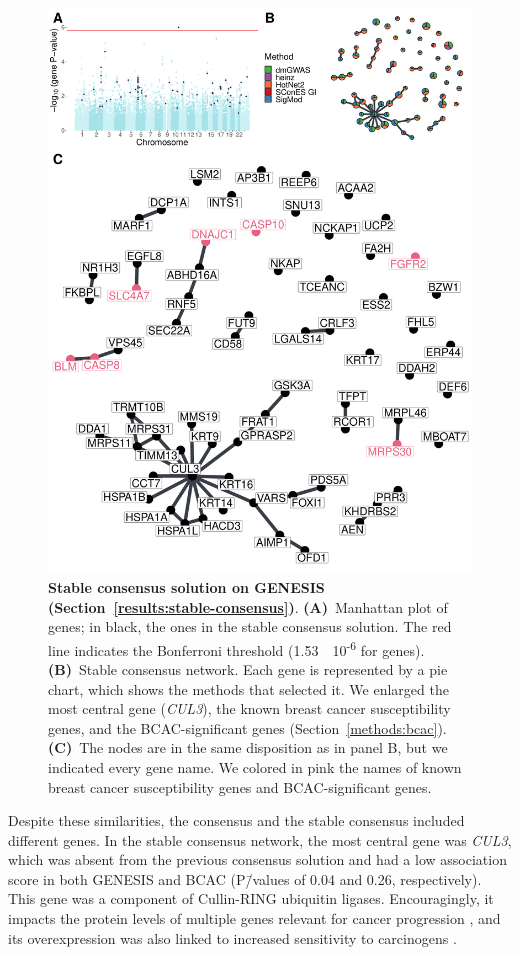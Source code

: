 \documentclass[10pt,letterpaper]{article}
\begin{document}
\begin{figure}[!ht]
  \centering
  \includegraphics[width=.8\linewidth]{./figures/figure_5.pdf}
  \caption{ \textbf{Stable consensus solution on GENESIS (Section~\ref{results:stable-consensus})}. \textbf{(A)}~Manhattan plot of genes; in black, the ones in the stable consensus solution. The red line indicates the Bonferroni threshold (1.53~\texttimes{}~10\textsuperscript{-6} for genes). \textbf{(B)}~Stable consensus network. Each gene is represented by a pie chart, which shows the methods that selected it. We enlarged the most central gene (\emph{CUL3}), the known breast cancer susceptibility genes, and the BCAC-significant genes (Section~\ref{methods:bcac}). \textbf{(C)}~The nodes are in the same disposition as in panel B, but we indicated every gene name. We colored in pink the names of known breast cancer susceptibility genes and BCAC-significant genes.}
  \label{fig:stable-consensus}
  \end{figure}

Despite these similarities, the consensus and the stable consensus included different genes. In the stable consensus network, the most central gene was \emph{CUL3}, which was absent from the previous consensus solution and had a low association score in both GENESIS and BCAC (P\=/values of 0.04 and 0.26, respectively). This gene was a component of Cullin-RING ubiquitin ligases. Encouragingly, it impacts the protein levels of multiple genes relevant for cancer progression \cite{Chen2016}, and its overexpression was also linked to increased sensitivity to carcinogens \cite{Loignon2009}.
\end{document}
